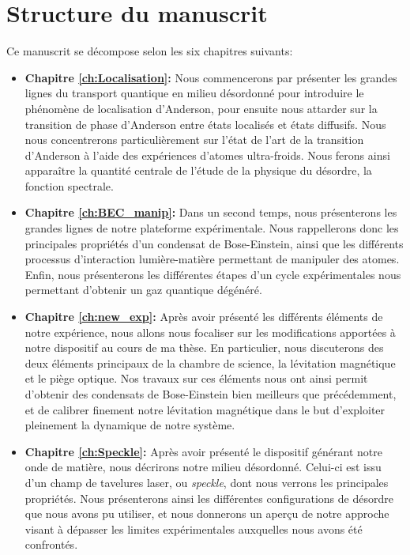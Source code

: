 \section{Structure du manuscrit}
Ce manuscrit se décompose selon les six chapitres suivants:
\begin{itemize}
\item[\textendash] \textbf{Chapitre \ref{ch:Localisation}:} Nous commencerons par présenter les grandes lignes du transport quantique en milieu désordonné pour introduire le phénomène de localisation d'Anderson, pour ensuite nous attarder sur la transition de phase d'Anderson entre états localisés et états diffusifs. Nous nous concentrerons particulièrement sur l'état de l'art de la transition d'Anderson à l'aide des expériences d'atomes ultra-froids.  Nous ferons ainsi apparaître la quantité centrale de l'étude de la physique du désordre, la fonction spectrale. \\

\item[\textendash] \textbf{Chapitre \ref{ch:BEC_manip}:} Dans un second temps, nous présenterons les grandes lignes de notre plateforme expérimentale. Nous rappellerons donc les principales propriétés d'un condensat de Bose-Einstein, ainsi que les différents processus d'interaction lumière-matière permettant de manipuler des atomes. Enfin, nous présenterons les différentes étapes d'un cycle expérimentales nous permettant d'obtenir un gaz quantique dégénéré. \\

\item[\textendash] \textbf{Chapitre \ref{ch:new_exp}:} Après avoir présenté les différents éléments de notre expérience, nous allons nous focaliser sur les modifications apportées à notre dispositif au cours de ma thèse. En particulier, nous discuterons des deux éléments principaux de la chambre de science, la lévitation magnétique et le piège optique. Nos travaux sur ces éléments nous ont ainsi permit d'obtenir des condensats de Bose-Einstein bien meilleurs que précédemment, et de calibrer finement notre lévitation magnétique dans le but d'exploiter pleinement la dynamique de notre système. \\

\item[\textendash] \textbf{Chapitre \ref{ch:Speckle}:} Après avoir présenté le dispositif générant notre onde de matière, nous décrirons notre milieu désordonné. Celui-ci est issu d'un champ de tavelures laser, ou \emph{speckle}, dont nous verrons les principales propriétés. Nous présenterons ainsi les différentes configurations de désordre que nous avons pu utiliser, et nous donnerons un aperçu de notre approche visant à dépasser les limites expérimentales auxquelles nous avons été confrontés. \\


\end{itemize}
